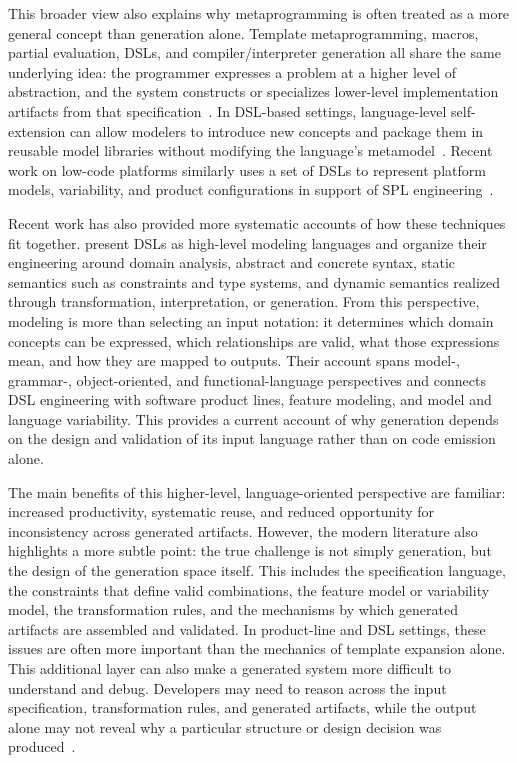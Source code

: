 This broader view also explains why metaprogramming is often treated as a more
general concept than generation alone. Template metaprogramming, macros,
partial evaluation, DSLs, and compiler/interpreter generation all share the
same underlying idea: the programmer expresses a problem at a higher level of
abstraction, and the system constructs or specializes lower-level
implementation artifacts from that
specification~\citep{Czarnecki2000,Taha2004,shaikhha2024}. In DSL-based
settings, language-level self-extension can allow modelers to introduce new
concepts and package them in reusable model libraries without modifying the
language's metamodel~\citep{gerasimov2024}. Recent work on low-code platforms
similarly uses a set of DSLs to represent platform models, variability, and
product configurations in support of SPL engineering~\citep{bragancca2021}.

Recent work has also provided more systematic accounts of how these techniques
fit together. \citet{wasowski2023} present DSLs as
high-level modeling languages and organize their engineering around domain
analysis, abstract and concrete syntax, static semantics such as constraints
and type systems, and dynamic semantics realized through transformation,
interpretation, or generation. From this perspective, modeling is more than
selecting an input notation: it determines which domain concepts can be
expressed, which relationships are valid, what those expressions mean, and how
they are mapped to outputs. Their account spans model-, grammar-,
object-oriented, and functional-language perspectives and connects DSL
engineering with software product lines, feature modeling, and model and
language variability. This provides a current account of why generation
depends on the design and validation of its input language rather than on code
emission alone.

The main benefits of this higher-level, language-oriented perspective are
familiar: increased productivity, systematic reuse, and reduced opportunity for
inconsistency across generated artifacts. However, the modern literature also
highlights a more subtle point: the true challenge is not simply generation,
but the design of the generation space itself. This includes the
specification language, the constraints that define valid combinations, the
feature model or variability model, the transformation rules, and the
mechanisms by which generated
artifacts are assembled and validated. In product-line and DSL settings, these
issues are often more important than the mechanics of template expansion alone.
This additional layer can also make a generated system more difficult to
understand and debug. Developers may need to reason across the input
specification, transformation rules, and generated artifacts, while the output
alone may not reveal why a particular structure or design decision was
produced~\citep{Czarnecki2000}.

